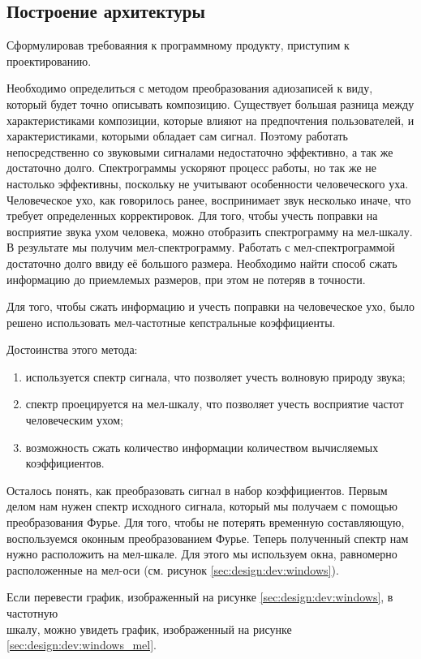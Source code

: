 \subsection{Построение архитектуры}
\label{sec:design:dev}

Сформулировав требоваяния к программному продукту, приступим к проектированию.

Необходимо определиться с методом преобразования адиозаписей к виду, который будет точно описывать композицию. Существует большая разница между характеристиками композиции, которые влияют на предпочтения пользователей, и характеристиками, которыми обладает сам сигнал. Поэтому работать непосредственно со звуковыми сигналами недостаточно эффективно, а так же достаточно долго. Спектрограммы ускоряют процесс работы, но так же не настолько эффективны, поскольку не учитывают особенности человеческого уха. Человеческое ухо, как говорилось ранее, воспринимает звук несколько иначе, что требует определенных корректировок. Для того, чтобы учесть поправки на восприятие звука ухом человека, можно отобразить спектрограмму на мел-шкалу. В результате мы получим мел-спектрограмму. Работать с мел-спектрограммой достаточно долго ввиду её большого размера. Необходимо найти способ сжать информацию до приемлемых размеров, при этом не потеряв в точности.

Для того, чтобы сжать информацию и учесть поправки на человеческое ухо, было решено использовать мел-частотные кепстральные коэффициенты.

Достоинства этого метода:
\begin{enumerate}
  \item используется спектр сигнала, что позволяет учесть волновую природу звука;
  \item спектр проецируется на мел-шкалу, что позволяет учесть восприятие частот человеческим ухом;
  \item возможность сжать количество информации количеством вычисляемых коэффициентов.
\end{enumerate}

Осталось понять, как преобразовать сигнал в набор коэффициентов. Первым делом нам нужен спектр исходного сигнала, который мы получаем с помощью преобразования Фурье. Для того, чтобы не потерять временную составляющую, воспользуемся оконным преобразованием Фурье. Теперь полученный спектр нам нужно расположить на мел-шкале. Для этого мы используем окна, равномерно расположенные на мел-оси (см. рисунок \ref{sec:design:dev:windows}).

Если перевести график, изображенный на рисунке \ref{sec:design:dev:windows}, в частотную \\шкалу, можно увидеть график, изображенный на рисунке \ref{sec:design:dev:windows_mel}.

